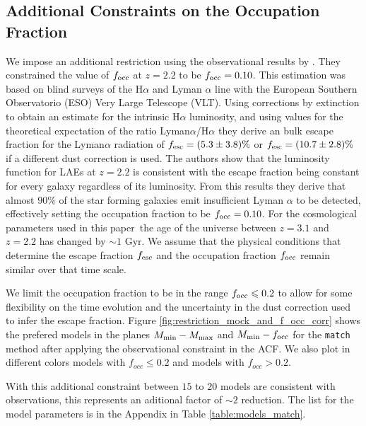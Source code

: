 \documentclass[usenatbib]{mn2e}
\newcommand{\documentname}{paper~}
\begin{document}
\subsection{Additional  Constraints on the Occupation Fraction}

We impose an additional restriction using the observational results
by \cite{Hayes2010}. They constrained the value of $f_{\rm
  occ}$ at $z=2.2$ to be $f_{\rm occ}=0.10$. This estimation was based
on blind surveys of the H$\alpha$ and Lyman $\alpha$ line with the European Southern
Observatorio (ESO) Very Large Telescope (VLT). Using corrections by
extinction to obtain an estimate for the intrinsic H$\alpha$
luminosity, and using values for the theoretical expectation of the
ratio Lyman$\alpha$/H$\alpha$ they derive an bulk escape fraction for
the Lyman$\alpha$ radiation of $f_{\rm esc}=(5.3\pm 3.8)\%$ or $f_{\rm
esc}=(10.7\pm 2.8)\%$ if a different dust correction is used. The
authors show that the luminosity function for LAEs at $z=2.2$ is
consistent with the escape fraction being constant for every galaxy
regardless of its luminosity. From this results they derive that
almost $90\%$ of the star forming galaxies emit insufficient
Lyman $\alpha$ to be detected, effectively setting the occupation
fraction to be $f_{\rm occ}=0.10$. For the cosmological parameters
used in this \documentname the age of the universe between $z=3.1$ and
$z=2.2$ has changed by $\sim 1$ Gyr. We assume that the physical
conditions that determine the escape fraction $f_{\rm esc}$ and the
occupation fraction $f_{\rm  occ}$ remain similar over that time
scale.

We limit the occupation fraction to
be in the range $f_{\rm  occ}\leq 0.2$ to allow for some flexibility on the time evolution
and the uncertainty in the dust correction used to infer the escape fraction. 
Figure  \ref{fig:restriction_mock_and_f_occ_corr}  shows the prefered
models in the planes $M_{\rm min}-M_{\rm  max}$ and $M_{\rm min}-f_{\rm occ}$ 
for the {\tt match} method after applying the observational constraint
in the ACF. We also plot in different colors models with $f_{occ}\leq0.2$ and
models with $f_{occ} > 0.2$.


 With this additional constraint between $15$ to $20$ models are
consistent with observations, this represents an aditional factor of $\sim 2$
reduction. The list for the model parameters is in the Appendix 
in Table \ref{table:models_match}.
\end{document}
